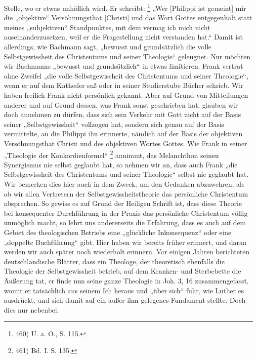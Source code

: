 Stelle, wo er etwas unhöflich wird. Er schreibt: \footnote{460) U. a. O., S. 115.} „Wer [Philippi ist gemeint] mir die „objektive“ Versöhnungsthat [Christi] und das Wort Gottes entgegenhält statt meines „subjektiven“ Standpunktes, mit dem vermag ich mich nicht auseinanderzusetzen, weil er die Fragestellung nicht verstanden hat.“ Damit ist allerdings, wie Bachmann sagt, „bewusst und grundsätzlich die volle Selbstgewissheit des Christentums und seiner Theologie“ geleugnet. Nur möchten wir Bachmanns „bewusst und grundsätzlich“ in etwas limitieren. Frank vertrat ohne Zweifel „die volle Selbstgewissheit des Christentums und seiner Theologie“, wenn er auf dem Katheder saß oder in seiner Studierstube Bücher schrieb. Wir haben freilich Frank nicht persönlich gekannt. Aber auf Grund von Mitteilungen anderer und auf Grund dessen, was Frank sonst geschrieben hat, glauben wir doch annehmen zu dürfen, dass sich sein Verkehr mit Gott nicht auf der Basis seiner „Selbstgewissheit“ vollzogen hat, sondern sich genau auf der Basis vermittelte, an die Philippi ihn erinnerte, nämlich auf der Basis der objektiven Versöhnungsthat Christi und des objektiven Wortes Gottes. Wie Frank in seiner „Theologie der Konkordienformel“ \footnote{461) Bd. I. S. 135.} annimmt, das Melanchthon seinen Synergismus nie selbst geglaubt hat, so nehmen wir an, dass auch Frank „die Selbstgewissheit des Christentums und seiner Theologie“ selbst nie geglaubt hat. Wir bemerken dies hier auch in dem Zweck, um den Gedanken abzuwehren, als ob wir allen Vertretern der Selbstgewissheitstheorie das persönliche Christentum absprechen. So gewiss es auf Grund der Heiligen Schrift ist, dass diese Theorie bei konsequenter Durchführung in der Praxis das persönliche Christentum völlig unmöglich macht, so lehrt uns andererseits die Erfahrung, dass es auch auf dem Gebiet des theologischen Betriebs eine „glückliche Inkonsequenz“ oder eine „doppelte Buchführung“ gibt. Hier haben wir bereits früher erinnert, und daran werden wir auch später noch wiederholt erinnern. Vor einigen Jahren berichteten deutschländische Blätter, dass ein Theologe, der theoretisch ebenfalls die Theologie der Selbstgewissheit betrieb, auf dem Kranken- und Sterbebette die Äußerung tat, er finde nun seine ganze Theologie in Joh. 3, 16 zusammengefasst, womit er tatsächlich aus seinem Ich heraus und „über sich“ fuhr, wie Luther es ausdrückt, und sich damit auf ein außer ihm gelegenes Fundament stellte. Doch dies nur nebenbei.